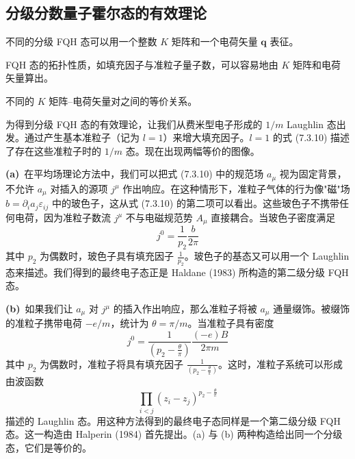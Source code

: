 \subsection{分级分数量子霍尔态的有效理论}

\begin{keypoints}
\item 不同的分级 FQH 态可以用一个整数 $K$ 矩阵和一个电荷矢量 $\pmb{q}$ 表征。
\item FQH 态的拓扑性质，如填充因子与准粒子量子数，可以容易地由 $K$ 矩阵和电荷矢量算出。
\item 不同的 $K$ 矩阵--电荷矢量对之间的等价关系。
\end{keypoints}

为得到分级 FQH 态的有效理论，让我们从费米型电子形成的 $1/m$ Laughlin 态出发。通过产生基本准粒子（记为 $l=1$）来增大填充因子。$l=1$ 的式 (7.3.10) 描述了存在这些准粒子时的 $1/m$ 态。现在出现两幅等价的图像。

\textbf{(a)}~在平均场理论方法中，我们可以把式 (7.3.10) 中的规范场 $a_\mu$ 视为固定背景，不允许 $a_\mu$ 对插入的源项 $j^\mu$ 作出响应。在这种情形下，准粒子气体的行为像"磁"场 $b=\partial_i a_j\varepsilon_{ij}$ 中的玻色子，这从式 (7.3.10) 的第二项可以看出。这些玻色子不携带任何电荷，因为准粒子数流 $j^\mu$ 不与电磁规范势 $A_\mu$ 直接耦合。当玻色子密度满足
\begin{equation*}
j^0=\frac{1}{p_2}\frac{b}{2\pi}
\end{equation*}
其中 $p_2$ 为偶数时，玻色子具有填充因子 $\frac{1}{p_2}$。玻色子的基态又可以用一个 Laughlin 态来描述。我们得到的最终电子态正是 Haldane (1983) 所构造的第二级分级 FQH 态。

\textbf{(b)}~如果我们让 $a_\mu$ 对 $j^\mu$ 的插入作出响应，那么准粒子将被 $a_\mu$ 通量缀饰。被缀饰的准粒子携带电荷 $-e/m$，统计为 $\theta=\pi/m$。当准粒子具有密度
\begin{equation*}
j^0=\frac{1}{(p_2-\frac{\theta}{\pi})}\frac{(-e)B}{2\pi m}
\end{equation*}
其中 $p_2$ 为偶数时，准粒子将具有填充因子 $\frac{1}{(p_2-\frac{\theta}{\pi})}$。这时，准粒子系统可以形成由波函数
\begin{equation*}
\prod_{i<j}(z_i-z_j)^{p_2-\frac{\theta}{\pi}}
\end{equation*}
描述的 Laughlin 态。用这种方法得到的最终电子态同样是一个第二级分级 FQH 态。这一构造由 Halperin (1984) 首先提出。(a) 与 (b) 两种构造给出同一个分级态，它们是等价的。

